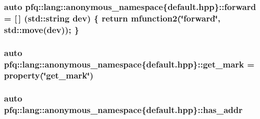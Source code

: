 \hypertarget{namespacepfq_1_1lang_1_1anonymous__namespace_02default_8hpp_03_aae08247030fea0f5e398b0a03d382257}{
\subsubsection[{forward}]{\setlength{\rightskip}{0pt plus 5cm}auto pfq\+::lang\+::anonymous\+\_\+namespace\{default.\+hpp\}\+::forward = \mbox{[}$\,$\mbox{]} (std\+::string dev) \{ return {\bf mfunction2}(\char`\"{}forward\char`\"{}, std\+::move(dev)); \}}}\label{namespacepfq_1_1lang_1_1anonymous__namespace_02default_8hpp_03_aae08247030fea0f5e398b0a03d382257}
\hypertarget{namespacepfq_1_1lang_1_1anonymous__namespace_02default_8hpp_03_ab733e24b3ca86450bea0b0888a6327d2}{
\subsubsection[{get\+\_\+mark}]{\setlength{\rightskip}{0pt plus 5cm}auto pfq\+::lang\+::anonymous\+\_\+namespace\{default.\+hpp\}\+::get\+\_\+mark = {\bf property}(\char`\"{}get\+\_\+mark\char`\"{})}}\label{namespacepfq_1_1lang_1_1anonymous__namespace_02default_8hpp_03_ab733e24b3ca86450bea0b0888a6327d2}
\hypertarget{namespacepfq_1_1lang_1_1anonymous__namespace_02default_8hpp_03_a74c6b7e812fb3d312ebf534960a6a91d}{
\subsubsection[{has\+\_\+addr}]{\setlength{\rightskip}{0pt plus 5cm}auto pfq\+::lang\+::anonymous\+\_\+namespace\{default.\+hpp\}\+::has\+\_\+addr}}\label{namespacepfq_1_1lang_1_1anonymous__namespace_02default_8hpp_03_a74c6b7e812fb3d312ebf534960a6a91d}
